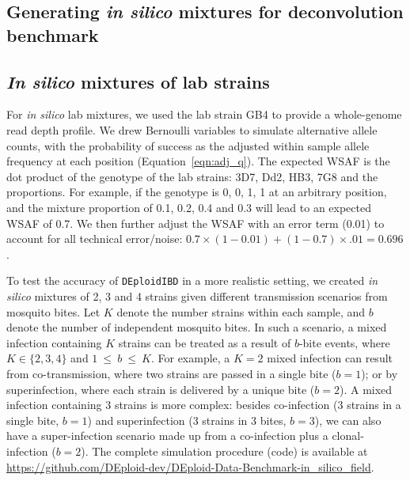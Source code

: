 \documentclass[9pt,lineno]{elife}
\begin{document}
\begin{appendixbox}
\section{Generating {\it in silico} mixtures for deconvolution benchmark}
\subsection{{\it In silico} mixtures of lab strains}
For {\it in silico} lab mixtures, we used the lab strain GB4 to provide a whole-genome read depth profile. We drew Bernoulli variables to simulate alternative allele counts, with the probability of success as the adjusted within sample allele frequency at each position (Equation~\ref{eqn:adj_q}). The expected WSAF is the dot product of the genotype of the lab strains: 3D7, Dd2, HB3, 7G8 and the proportions. For example, if the genotype is 0, 0, 1, 1 at an arbitrary position, and the mixture proportion of 0.1, 0.2, 0.4 and 0.3 will lead to an expected WSAF of 0.7. We then further adjust the WSAF with an error term (0.01) to account for all technical error/noise: $0.7 \times(1-0.01) + (1-0.7) \times.01 = 0.696$.

\vspace{.5cm}
To test the accuracy of \texttt{DEploidIBD} in a more realistic setting, we created {\it in silico} mixtures of 2, 3 and 4 strains given different transmission scenarios from mosquito bites. Let $K$ denote the number strains within each sample, and $b$ denote the number of independent mosquito bites. In such a scenario, a mixed infection containing $K$ strains can be treated as a result of $b$-bite events, where $K \in \{2,3,4\}$ and $1~{\leq}~{b}~{\leq}~K$. For example, a $K=2$ mixed infection can result from co-transmission, where two strains are passed in a single bite ($b=1$); or by superinfection, where each strain is delivered by a unique bite ($b=2$). A mixed infection containing 3 strains is more complex: besides co-infection (3 strains in a single bite, $b=1$) and superinfection (3 strains in 3 bites, $b=3$), we can also have a super-infection scenario made up from a co-infection plus a clonal-infection ($b=2$). The complete simulation procedure (code) is available at \url{https://github.com/DEploid-dev/DEploid-Data-Benchmark-in_silico_field}.


\end{appendixbox}
\end{document}
